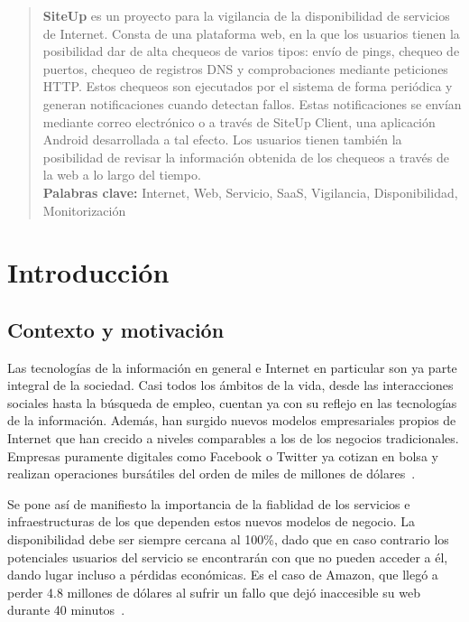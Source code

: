 \documentclass[a4paper,12pt]{article}
\begin{document}
\portada

\vspace{0.25cm}

\begin{abstract}
\textbf{SiteUp} es un proyecto para la vigilancia de la disponibilidad
  de servicios de Internet. Consta de una plataforma web, en la que los usuarios
  tienen la posibilidad dar de alta chequeos de varios tipos: envío de pings,
  chequeo de puertos, chequeo de registros DNS y comprobaciones mediante
  peticiones HTTP. Estos chequeos son ejecutados por el sistema de forma
  periódica y generan notificaciones cuando detectan fallos. Estas
  notificaciones se envían mediante correo electrónico o a través de SiteUp
  Client, una aplicación Android desarrollada a tal efecto. Los usuarios tienen
  también la posibilidad de revisar la información obtenida de los chequeos a
  través de la web a lo largo del tiempo. \\

  \textbf{Palabras clave:} Internet, Web, Servicio, SaaS, Vigilancia,
  Disponibilidad, Monitorización

\end{abstract}



\section{Introducción}

\subsection{Contexto y motivación}

Las tecnologías de la información en general e Internet en particular son ya
parte integral de la sociedad. Casi todos los ámbitos de la vida, desde las
interacciones sociales hasta la búsqueda de empleo, cuentan ya con su reflejo en
las tecnologías de la información. Además, han surgido nuevos modelos
empresariales propios de Internet que han crecido a niveles comparables a los de
los negocios tradicionales. Empresas puramente digitales como Facebook o Twitter
ya cotizan en bolsa y realizan operaciones bursátiles del orden de miles de
millones de dólares~\cite{facebook-acquires-whatsapp}.

Se pone así de manifiesto la importancia de la fiablidad de los servicios e
infraestructuras de los que dependen estos nuevos modelos de negocio. La
disponibilidad debe ser siempre cercana al 100\%, dado que en caso contrario los
potenciales usuarios del servicio se encontrarán con que no pueden acceder a él,
dando lugar incluso a pérdidas económicas. Es el caso de Amazon, que llegó a
perder 4.8 millones de dólares al sufrir un fallo que dejó inaccesible su web
durante 40 minutos~\cite{amazon}.
\end{document}

